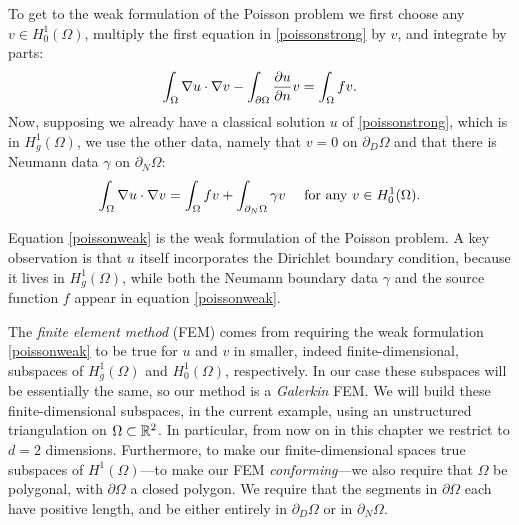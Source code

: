 To get to the weak formulation of the Poisson problem we first choose any $v\in H_0^1(\Omega)$, multiply the first equation in \eqref{poissonstrong} by $v$, and integrate by parts:
\begin{equation*}
\int_\Omega \nabla u \cdot \nabla v - \int_{\partial\Omega} \frac{\partial u}{\partial n} v = \int_\Omega f v.
\end{equation*}
Now, supposing we already have a classical solution $u$ of \eqref{poissonstrong}, which is in $H_g^1(\Omega)$, we use the other data, namely that $v=0$ on $\partial_D\Omega$ and that there is Neumann data $\gamma$ on $\partial_N\Omega$:
\begin{equation}
\int_\Omega \nabla u \cdot \nabla v = \int_\Omega f v + \int_{\partial_N\Omega} \gamma v\quad \text{ for any } v\in H_0^1(\Omega). \label{poissonweak}
\end{equation}

Equation \eqref{poissonweak} is the weak formulation of the Poisson problem.  A key observation is that $u$ itself incorporates the Dirichlet boundary condition, because it lives in $H_g^1(\Omega)$, while both the Neumann boundary data $\gamma$ and the source function $f$ appear in equation \eqref{poissonweak}.

The \emph{finite element method} (FEM) comes from requiring the weak formulation  \eqref{poissonweak} to be true for $u$ and $v$ in smaller, indeed finite-dimensional, subspaces of $H_g^1(\Omega)$ and $H_0^1(\Omega)$, respectively.  In our case these subspaces will be essentially the same, so our method is a \emph{Galerkin} FEM.  We will build these finite-dimensional subspaces, in the current example, using an unstructured triangulation on $\Omega\subset \mathbb{R}^2$.  In particular, from now on in this chapter we restrict to $d=2$ dimensions.  Furthermore, to make our finite-dimensional spaces true subspaces of $H^1(\Omega)$---to make our FEM \emph{conforming}---we also require that $\Omega$ be polygonal, with $\partial\Omega$ a closed polygon.  We require that the segments in $\partial\Omega$ each have positive length, and be either entirely in $\partial_D\Omega$ or in $\partial_N\Omega$.


